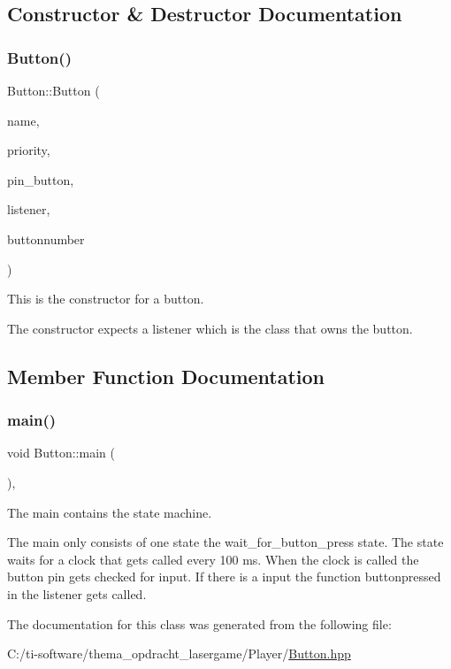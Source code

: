 \subsection{Constructor \& Destructor Documentation}
\mbox{\label{class_button_a7771486e8e6649ee30c85ab5580796da}} 
\subsubsection{\texorpdfstring{Button()}{Button()}}
{\footnotesize\ttfamily Button\+::\+Button (\begin{DoxyParamCaption}\item[{const char $\ast$}]{name,  }\item[{int}]{priority,  }\item[{hwlib\+::pin\+\_\+in \&}]{pin\+\_\+button,  }\item[{\mbox{\hyperlink{class_button_listener}{Button\+Listener}} \&}]{listener,  }\item[{unsigned int}]{buttonnumber }\end{DoxyParamCaption})\hspace{0.3cm}{\ttfamily [inline]}}



This is the constructor for a button. 

The constructor expects a listener which is the class that owns the button. 

\subsection{Member Function Documentation}
\mbox{\label{class_button_a4cc671cc425acd0ee1b8f2f437cf40db}} 
\subsubsection{\texorpdfstring{main()}{main()}}
{\footnotesize\ttfamily void Button\+::main (\begin{DoxyParamCaption}{ }\end{DoxyParamCaption})\hspace{0.3cm}{\ttfamily [inline]}, {\ttfamily [override]}}



The main contains the state machine. 

The main only consists of one state the wait\+\_\+for\+\_\+button\+\_\+press state. The state waits for a clock that gets called every 100 ms. When the clock is called the button pin gets checked for input. If there is a input the function buttonpressed in the listener gets called. 

The documentation for this class was generated from the following file\+:\begin{DoxyCompactItemize}
\item 
C\+:/ti-\/software/thema\+\_\+opdracht\+\_\+lasergame/\+Player/\mbox{\hyperlink{_button_8hpp}{Button.\+hpp}}\end{DoxyCompactItemize}

